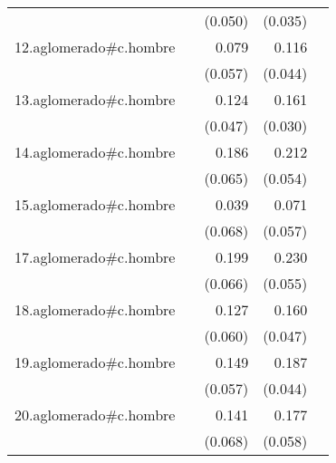 {\begin{longtable}{l*{4}{D{.}{.}{-1}}}
            &                     &     (0.050)         &     (0.035)         &                     \\
\addlinespace
12.aglomerado#c.hombre&                     &       0.079         &       0.116\sym{**} &                     \\
            &                     &     (0.057)         &     (0.044)         &                     \\
\addlinespace
13.aglomerado#c.hombre&                     &       0.124\sym{**} &       0.161\sym{***}&                     \\
            &                     &     (0.047)         &     (0.030)         &                     \\
\addlinespace
14.aglomerado#c.hombre&                     &       0.186\sym{**} &       0.212\sym{***}&                     \\
            &                     &     (0.065)         &     (0.054)         &                     \\
\addlinespace
15.aglomerado#c.hombre&                     &       0.039         &       0.071         &                     \\
            &                     &     (0.068)         &     (0.057)         &                     \\
\addlinespace
17.aglomerado#c.hombre&                     &       0.199\sym{**} &       0.230\sym{***}&                     \\
            &                     &     (0.066)         &     (0.055)         &                     \\
\addlinespace
18.aglomerado#c.hombre&                     &       0.127\sym{*}  &       0.160\sym{***}&                     \\
            &                     &     (0.060)         &     (0.047)         &                     \\
\addlinespace
19.aglomerado#c.hombre&                     &       0.149\sym{**} &       0.187\sym{***}&                     \\
            &                     &     (0.057)         &     (0.044)         &                     \\
\addlinespace
20.aglomerado#c.hombre&                     &       0.141\sym{*}  &       0.177\sym{**} &                     \\
            &                     &     (0.068)         &     (0.058)         &                     \\

\end{longtable}}
